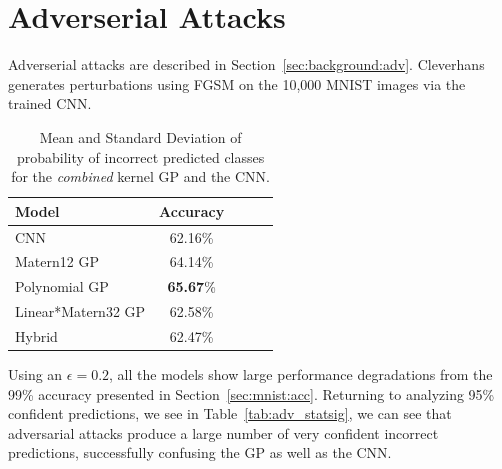 \documentclass{article}
\begin{document}
\section{Adverserial Attacks}
\label{sec:adversarial}
Adverserial attacks are described in Section~\ref{sec:background:adv}. Cleverhans~\cite{papernot2017cleverhans} generates perturbations using FGSM on the 10,000 MNIST images via the trained CNN.

\begin{table}[htb]
\caption{Mean and Standard Deviation of probability of incorrect predicted classes for the \textit{combined} kernel GP and the CNN.}
\vskip 0.15in
\begin{center}
\begin{small}
\begin{sc}
\begin{tabular}{lcccr}
\toprule
Model 				& Accuracy \\ 				
\midrule
CNN    				& 62.16\%  \\
Matern12 GP	 		& 64.14\%  \\
Polynomial GP    	& \textbf{65.67}\%  \\
Linear*Matern32 GP	& 62.58\%  \\
Hybrid    			& 62.47\%  \\
\bottomrule
\end{tabular}
\end{sc}
\end{small}
\end{center}
\vskip -0.1in
\label{tab:adv:accuracies}
\end{table}


Using an $\epsilon=0.2$, all the models show large performance degradations from the 99\% accuracy presented in Section~\ref{sec:mnist:acc}.  Returning to analyzing 95\% confident predictions, we see in Table~\ref{tab:adv_statsig}, we can see that adversarial attacks produce a large number of very confident incorrect predictions, successfully confusing the GP as well as the CNN.
\end{document}
